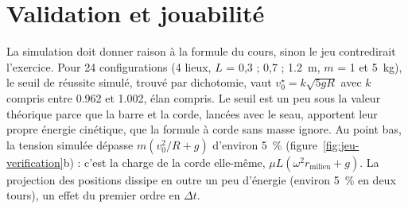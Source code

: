 \section{Validation et jouabilité}

La simulation doit donner raison à la formule du cours, sinon le jeu
contredirait l'exercice. Pour 24 configurations (4 lieux, \(L\) = 0,3 ; 0,7 ;
\SI{1,2}{m}, \(m\) = 1 et \SI{5}{kg}), le seuil de réussite simulé, trouvé par
dichotomie, vaut \(v_0^\star = k \sqrt{5 g R}\) avec \(k\) compris entre \num{0,962}
et \num{1,002}, élan compris. Le seuil est un peu sous la valeur théorique parce que
la barre et la corde, lancées avec le seau, apportent leur propre énergie
cinétique, que la formule à corde sans masse ignore. Au point bas, la tension
simulée dépasse \(m (v_0^2/R + g)\) d'environ \SI{5}{\percent}
(figure~\ref{fig:jeu-verification}b) : c'est la charge de la corde elle-même,
\(\mu L (\omega^2 r_{\text{milieu}} + g)\). La projection des positions dissipe en outre
un peu d'énergie (environ \SI{5}{\percent} en deux tours), un effet du premier ordre
en \(\Delta t\).

